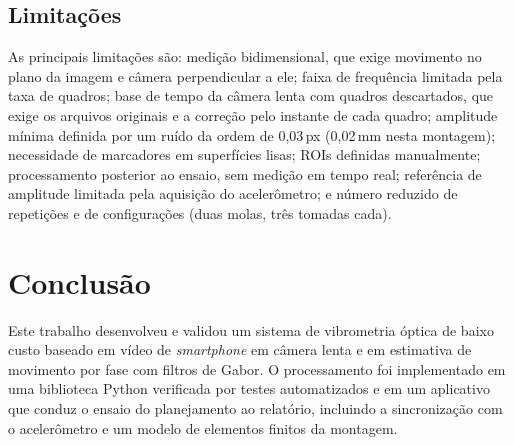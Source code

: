 \documentclass[a4paper,10pt,twocolumn]{article}
\begin{document}
\subsection{Limitações}

As principais limitações são: medição bidimensional, que exige movimento no plano da imagem e câmera perpendicular a ele; faixa de frequência limitada pela taxa de quadros; base de tempo da câmera lenta com quadros descartados, que exige os arquivos originais e a correção pelo instante de cada quadro; amplitude mínima definida por um ruído da ordem de 0,03\,px (0,02\,mm nesta montagem); necessidade de marcadores em superfícies lisas; ROIs definidas manualmente; processamento posterior ao ensaio, sem medição em tempo real; referência de amplitude limitada pela aquisição do acelerômetro; e número reduzido de repetições e de configurações (duas molas, três tomadas cada).

\section{Conclusão}


Este trabalho desenvolveu e validou um sistema de vibrometria óptica de baixo custo baseado em vídeo de \textit{smartphone} em câmera lenta e em estimativa de movimento por fase com filtros de Gabor. O processamento foi implementado em uma biblioteca Python verificada por testes automatizados e em um aplicativo que conduz o ensaio do planejamento ao relatório, incluindo a sincronização com o acelerômetro e um modelo de elementos finitos da montagem.
\end{document}
